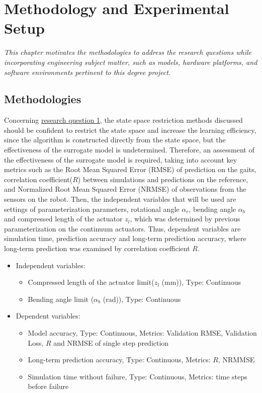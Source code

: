 \chapter{Methodology and Experimental Setup}
\label{chap3}
\textit{This chapter motivates the methodologies to address the research questions while incorporating engineering subject matter, such as models, hardware platforms, and software environments pertinent to this degree project.} 

\section{Methodologies}
\label{Sec:test_def}
Concerning \hyperref[rq1]{research question 1}, the state space restriction methods discussed should be confident to restrict the state space and increase the learning efficiency, since the algorithm is constructed directly from the state space, but the effectiveness of the surrogate model is undetermined. Therefore, an assessment of the effectiveness of the surrogate model is required, taking into account key metrics such as the Root Mean Squared Error (RMSE) of prediction on the gaits, correlation coefficient($R$) between simulations and predictions on the reference, and Normalized Root Mean Squared Error (NRMSE) of observations from the sensors on the robot. Then, the independent variables that will be used are settings of parameterization parameters, rotational angle $\alpha_r$, bending angle $\alpha_b$ and compressed length of the actuator $z_l$, which was determined by previous parameterization on the continuum actuators\cite{jiOmnidirectionalWalkingQuadruped2022}. Thus, dependent variables are simulation time, prediction accuracy and long-term prediction accuracy, where long-term prediction was examined by correlation coefficient $R$.
\begin{itemize}
    \item Independent variables: 
    \begin{itemize}
        \item Compressed length of the actuator limit($z_l$ (mm)), Type: Continuous
        \item Bending angle limit ($\alpha_b$ (rad)), Type: Continuous
    \end{itemize}
    \item Dependent variables:
    \begin{itemize}
        \item Model accuracy, Type: Continuous, Metrics: Validation RMSE, Validation Loss, $R$ and NRMSE of single step prediction
        \item Long-term prediction accuracy, Type: Continuous, Metrics: $R$, NRMMSE
        \item Simulation time without failure, Type: Continuous, Metrics: time steps before failure 
    \end{itemize}
\end{itemize}

